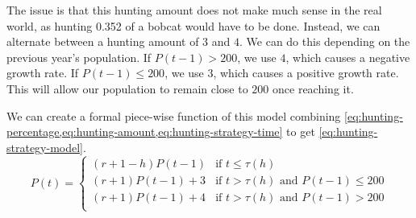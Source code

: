 \documentclass{article}
\begin{document}
The issue is that this hunting amount does not make much sense in the real world, as hunting 0.352 of a bobcat would have to be done. Instead, we can alternate between a hunting amount of $3$ and $4$. We can do this depending on the previous year's population. If $P(t-1) > 200$, we use $4$, which causes a negative growth rate. If $P(t-1) \le 200$, we use $3$, which causes a positive growth rate. This will allow our population to remain close to $200$ once reaching it.

We can create a formal piece-wise function of this model combining \cref{eq:hunting-percentage,eq:hunting-amount,eq:hunting-strategy-time} to get \cref{eq:hunting-strategy-model}.
\begin{equation}\label{eq:hunting-strategy-model}
P(t) =
    \begin{cases}
        (r+1-h)P(t-1)  & \text{if } t \le \tau(h) \\
        (r+1)P(t-1) + 3& \text{if } t > \tau(h) \text{ and } P(t-1) \le 200 \\
        (r+1)P(t-1) + 4& \text{if } t > \tau(h) \text{ and } P(t-1) > 200 \\
    \end{cases}
\end{equation}
\end{document}
